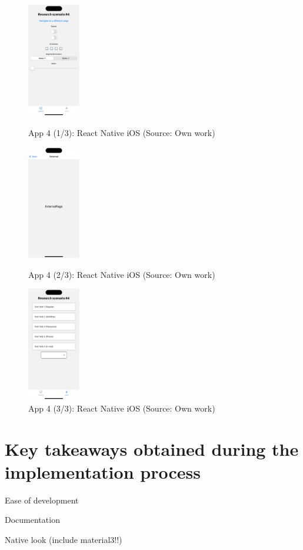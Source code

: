 \begin{figure}[H]
  \begin{minipage}{.31\textwidth}
    \centering
    \includegraphics[height=50mm]{img/app4_1_rn_ios}
    \caption{App 4 (1/3): React Native iOS (Source: Own work)}
    \label{fig:app4_1_rn_ios}
  \end{minipage}
  \hfill
  \begin{minipage}{.31\textwidth}
    \centering
    \includegraphics[height=50mm]{img/app4_2_rn_ios}
    \caption{App 4 (2/3): React Native iOS (Source: Own work)}
    \label{fig:app4_2_rn_ios}
  \end{minipage}
  \hfill
  \begin{minipage}{.31\textwidth}
    \centering
    \includegraphics[height=50mm]{img/app4_3_rn_ios}
    \caption{App 4 (3/3): React Native iOS (Source: Own work)}
    \label{fig:app4_3_rn_ios}
  \end{minipage}
\end{figure}

\section{Key takeaways obtained during the implementation process}

Ease of development

Documentation

Native look (include material3!!)
